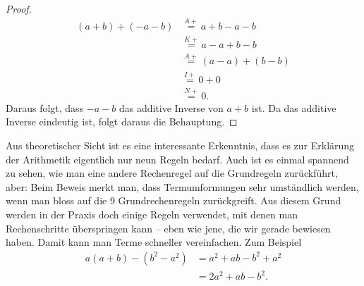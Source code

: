 \begin{proof}

    \[
        \begin{aligned}
            (a+b) + (-a - b) & \stackrel{A+}{=} a+b-a-b     \\
                             & \stackrel{K+}{=} a-a+b-b     \\
                             & \stackrel{A+}{=} (a-a)+(b-b) \\
                             & \stackrel{I+}{=} 0+0         \\
                             & \stackrel{N+}{=} 0.
        \end{aligned}
    \]
    Daraus folgt, dass \(-a-b\) das additive Inverse von \(a+b\) ist. Da das additive Inverse eindeutig ist, folgt daraus die Behauptung.
\end{proof}

Aus theoretischer Sicht ist es eine interessante Erkenntnis, dass es zur Erklärung der Arithmetik eigentlich nur neun Regeln bedarf. Auch ist es einmal spannend zu sehen, wie man eine andere Rechenregel auf die Grundregeln zurückführt, aber: Beim Beweis merkt man, dass Termumformungen sehr umständlich werden, wenn man bloss auf die 9 Grundrechenregeln zurückgreift. Aus diesem Grund werden in der Praxis doch einige Regeln verwendet, mit denen man Rechenschritte überspringen kann -- eben wie jene, die wir gerade bewiesen haben. Damit kann man Terme schneller vereinfachen. Zum Beispiel
\[
    \begin{aligned}
        a(a+b)-(b^2-a^2)
         & = a^2+ab-b^2+a^2 \\
         & = 2a^2+ab-b^2.
    \end{aligned}
\]

